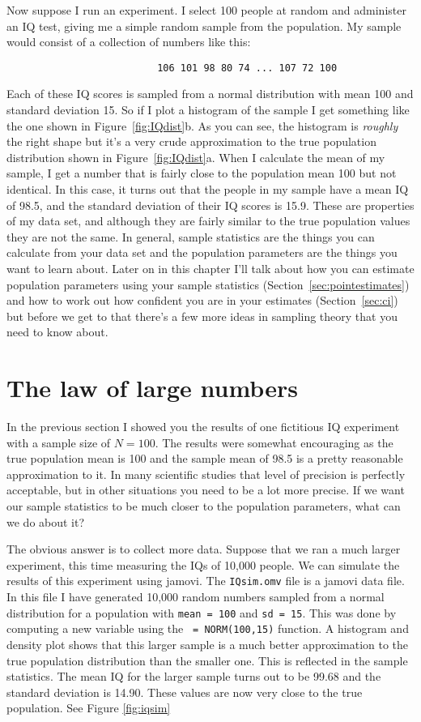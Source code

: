 Now suppose I run an experiment. I select 100 people at random and administer an IQ test, giving me a simple random sample from the population. My sample would consist of a collection of numbers like this:
\begin{verbatim}
                          106 101 98 80 74 ... 107 72 100
\end{verbatim}
Each of these IQ scores is sampled from a normal distribution with mean 100 and standard deviation 15. So if I  plot a histogram of the sample I get something like the one shown in Figure~\ref{fig:IQdist}b. As you can see, the histogram is {\it roughly} the right shape but it's a very crude approximation to the true population distribution shown in Figure~\ref{fig:IQdist}a. When I calculate the mean of my sample, I get a number that is fairly close to the population mean 100 but not identical. In this case, it turns out that the people in my sample have a mean IQ of 98.5, and the standard deviation of their IQ scores is 15.9. These  are properties of my data set, and although they are fairly similar to the true population values they are not the same. In general, sample statistics are the things you can calculate from your data set and the population parameters are the things you want to learn about. Later on in this chapter I'll talk about how you can estimate population parameters using your sample statistics (Section~\ref{sec:pointestimates}) and how to work out how confident you are in your estimates (Section~\ref{sec:ci}) but before we get to that there's a few more ideas in sampling theory that you need to know about. 


\section{The law of large numbers~\label{sec:lawlargenumbers}}

In the previous section I showed you the results of one fictitious IQ experiment with a sample size of $N=100$. The results were somewhat encouraging as the true population mean is 100 and the sample mean of 98.5 is a pretty reasonable approximation to it. In many scientific studies that level of precision is perfectly acceptable, but in other situations you need to be a lot more precise. If we want our sample statistics to be much closer to the population parameters, what can we do about it?

The obvious answer is to collect more data. Suppose that we ran a much larger experiment, this time measuring the IQs of 10,000 people. We can simulate the results of this experiment using jamovi. The \texttt{IQsim.omv} file is a jamovi data file. In this file I have generated 10,000 random numbers sampled from a normal distribution for a population with \texttt{mean = 100} and \texttt{sd = 15}. This was done by computing a new variable using the \texttt{ = NORM(100,15)} function. A histogram and density plot shows that this larger sample is a much better approximation to the true population distribution than the smaller one. This is reflected in the sample statistics. The mean IQ for the larger sample turns out to be 99.68 and the standard deviation is 14.90. These values are now very close to the true population. See Figure \ref{fig:iqsim}

